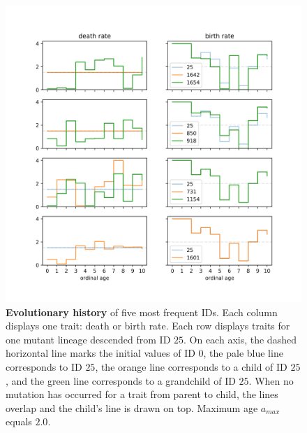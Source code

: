 \documentclass[11pt, a4paper]{article}
\theoremstyle{definition}
\begin{document}
\begin{appendices}
    \begin{figure}
        \center
        \includegraphics[width=\textwidth]{figures/phylo2.png}
        \caption{\textbf{Evolutionary history} of five most frequent IDs. Each column displays one trait: death or birth rate. Each row displays traits for one mutant lineage descended from ID $25$. On each axis, the dashed horizontal line marks the initial values of ID $0$, the pale blue line corresponds to ID $25$, the orange line corresponds to a child of ID $25$, and the green line corresponds to a grandchild of ID $25$. When no mutation has occurred for a trait from parent to child, the
        lines overlap and the child's line is drawn on top. Maximum age $a_{max}$ equals $2.0$.}
        \label{fig2}
    \end{figure}


\end{appendices}
\end{document}
